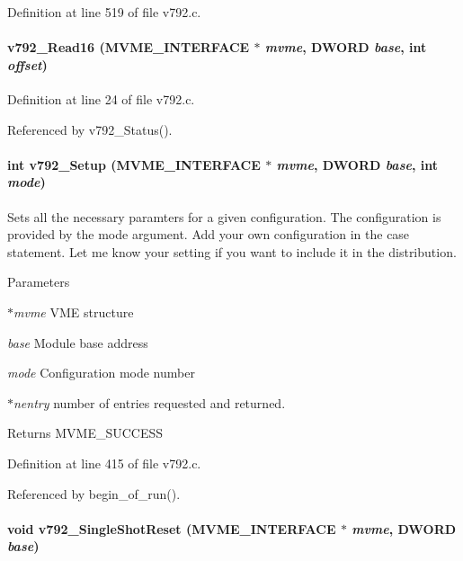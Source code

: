 Definition at line 519 of file v792.c.
\paragraph[{v792\_\-Read16}]{ v792\_\-Read16 ({\bf MVME\_\-INTERFACE} $\ast$ {\em mvme}, \/  {\bf DWORD} {\em base}, \/  int {\em offset})}\hfill\label{v792_8c_a2da00222f79ec8c939c45c45ca1a4998}


Definition at line 24 of file v792.c.

Referenced by v792\_\-Status().
\paragraph[{v792\_\-Setup}]{\setlength{\rightskip}{0pt plus 5cm}int v792\_\-Setup ({\bf MVME\_\-INTERFACE} $\ast$ {\em mvme}, \/  {\bf DWORD} {\em base}, \/  int {\em mode})}\hfill\label{v792_8c_ab1fa02b31b58838414803d8d750dbaa3}
Sets all the necessary paramters for a given configuration. The configuration is provided by the mode argument. Add your own configuration in the case statement. Let me know your setting if you want to include it in the distribution. 
\begin{DoxyParams}{Parameters}
\item[{\em $\ast$mvme}]VME structure \item[{\em base}]Module base address \item[{\em mode}]Configuration mode number \item[{\em $\ast$nentry}]number of entries requested and returned. \end{DoxyParams}
\begin{DoxyReturn}{Returns}
MVME\_\-SUCCESS 
\end{DoxyReturn}


Definition at line 415 of file v792.c.

Referenced by begin\_\-of\_\-run().
\paragraph[{v792\_\-SingleShotReset}]{\setlength{\rightskip}{0pt plus 5cm}void v792\_\-SingleShotReset ({\bf MVME\_\-INTERFACE} $\ast$ {\em mvme}, \/  {\bf DWORD} {\em base})}\hfill\label{v792_8c_a00c1512a1b145d46fdac9cbbfa867f61}


